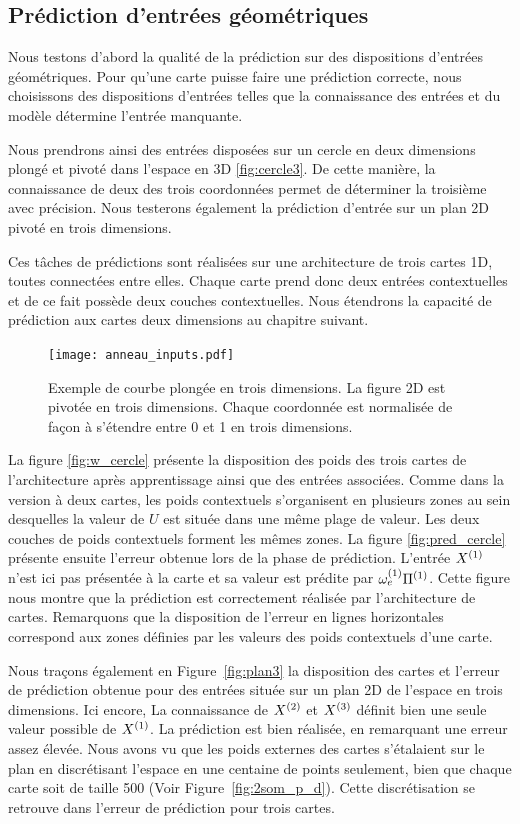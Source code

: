 \documentclass[../main]{subfiles}
\begin{document}
\subsection{Prédiction d'entrées géométriques}

Nous testons d'abord la qualité de la prédiction sur des dispositions d'entrées géométriques.
Pour qu'une carte puisse faire une prédiction correcte, nous choisissons des dispositions d'entrées telles que la connaissance des entrées et du modèle détermine l'entrée manquante.

Nous prendrons ainsi des entrées disposées sur un cercle en deux dimensions plongé et pivoté dans l'espace en 3D \ref{fig:cercle3}. De cette manière, la connaissance de deux des trois coordonnées permet de déterminer la troisième avec précision. Nous testerons également la prédiction d'entrée sur un plan 2D pivoté en trois dimensions.

Ces tâches de prédictions sont réalisées sur une architecture de trois cartes 1D, toutes connectées entre elles. Chaque carte prend donc deux entrées contextuelles et de ce fait possède deux couches contextuelles.
Nous étendrons la capacité de prédiction aux cartes deux dimensions au chapitre suivant.

\begin{figure}
	\centering\texttt{[image: anneau\_inputs.pdf]}
	\caption{Exemple de courbe plongée en trois dimensions. La figure 2D est pivotée en trois dimensions. Chaque coordonnée est normalisée de façon à s'étendre entre 0 et 1 en trois dimensions.
	\label{fig:in_3D}}
\end{figure}

La figure \ref{fig:w_cercle} présente la disposition des poids des trois cartes de l'architecture après apprentissage ainsi que des entrées associées. 
Comme dans la version à deux cartes, les poids contextuels s'organisent en plusieurs zones au sein desquelles la valeur de $U$ est située dans une même plage de valeur.
Les deux couches de poids contextuels forment les mêmes zones.
La figure \ref{fig:pred_cercle} présente ensuite l'erreur obtenue lors de la phase de prédiction. L'entrée $X^{({1})}$ n'est ici pas présentée à la carte et sa valeur est prédite par $\omega_{e}^{({1})}{\Pi^{({1})}}$. 
Cette figure nous montre que la prédiction est correctement réalisée par l'architecture de cartes. Remarquons que la disposition de l'erreur en lignes horizontales correspond aux zones définies par les valeurs des poids contextuels d'une carte.

Nous traçons également en Figure~\ref{fig:plan3} la disposition des cartes et l'erreur de prédiction obtenue pour des entrées située sur un plan 2D de l'espace en trois dimensions. Ici encore, La connaissance de $X^{({2})}$ et $X^{({3})}$ définit bien une seule valeur possible de $X^{({1})}$. La prédiction est bien réalisée, en remarquant une erreur assez élevée. 
Nous avons vu que les poids externes des cartes s'étalaient sur le plan en discrétisant l'espace en une centaine de points seulement, bien que chaque carte soit de taille 500 (Voir Figure~\ref{fig:2som_p_d}). 
Cette discrétisation se retrouve dans l'erreur de prédiction pour trois cartes.
\end{document}
